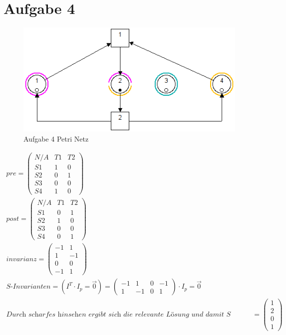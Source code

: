 \documentclass[10pt]{scrartcl}
\begin{document}
\section{Aufgabe 4}
	\begin{figure}[H]
    			\centering
				\includegraphics[scale=0.5]{aufg4.png}		
            	\caption{Aufgabe 4 Petri Netz}
            	\label{petri:aufg4}
			\end{figure}
	\begin{align*}
		pre = \begin{pmatrix} N/A & T1 & T2 \\
						 S1 & 1 & 0 \\
						 S2 & 0 & 1 \\
						 S3 & 0 & 0 \\
						 S4 & 1 & 0 \end{pmatrix}\\ 	
		post = \begin{pmatrix} N/A & T1 & T2 \\
						 S1 & 0 & 1 \\
						 S2 & 1 & 0 \\
						 S3 & 0 & 0 \\
						 S4 & 0 & 1 \end{pmatrix}\\
		invarianz = \begin{pmatrix}
						 -1 & 1 \\
						 1 & -1 \\
						 0 & 0 \\
						 -1 & 1 \end{pmatrix}\\
		\textit{S-Invarianten} = (I^T \cdotp I_p = \overrightarrow{0}) = \begin{pmatrix}
						 -1 & 1 & 0 & -1\\
						 1 & -1 &0 & 1\end{pmatrix}
		\cdot I_p = \overrightarrow{0}\\ 
		\textit{Durch scharfes hinsehen ergibt sich die relevante Lösung und damit S Invariante} = \begin{pmatrix} 
						 1 \\
						 2\\
						 0\\
						 1\end{pmatrix}				 		 				  				 			
	\end{align*}
\end{document}
